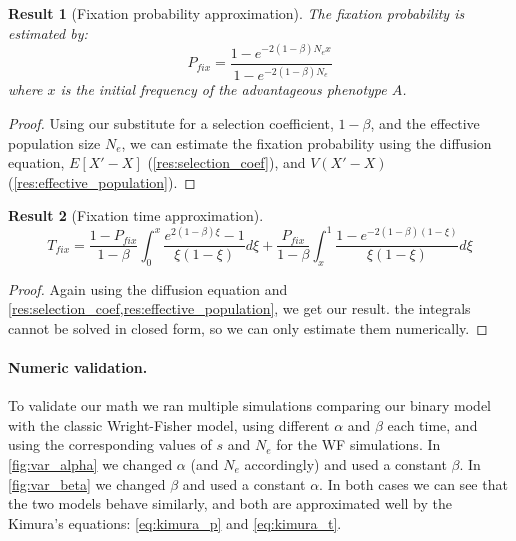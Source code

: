 \documentclass[12pt]{extarticle}
\newtheorem{result}{Result}
\begin{document}
\begin{result}[Fixation probability approximation]
The fixation probability is estimated by:
\begin{equation}\label{eq:kimura_p}
P_{fix} = \frac{1-e^{-2(1-\beta)N_e x}}{1-e^{-2(1-\beta)N_e}}
\end{equation}
where $x$ is the initial frequency of the advantageous phenotype $\hat{A}$.
\end{result}
\begin{proof}
Using our substitute for a selection coefficient, $1-\beta$, and the effective population size $N_e$, we can estimate the fixation probability using the diffusion equation, $E[X'-X]$ (\cref{res:selection_coef}), and $V(X'-X)$ (\cref{res:effective_population}).
\end{proof}

\begin{result}[Fixation time approximation]
\begin{equation}\label{eq:kimura_t}
T_{fix}=\frac{1-P_{fix}}{1-\beta}\int_0^x\frac{e^{2(1-\beta) \xi}-1}{\xi(1-\xi)}d\xi+ \frac{P_{fix}}{1-\beta}\int_x^1\frac{1-e^{-2(1-\beta)(1-\xi)}}{\xi(1-\xi)}d\xi
\end{equation}
\end{result}

\begin{proof}
Again using the diffusion equation and \cref{res:selection_coef,res:effective_population}, we get our result.
the integrals cannot be solved in closed form, so we can only estimate them numerically.
\end{proof}

\paragraph{Numeric validation.}
To validate our math we ran multiple simulations comparing our binary model with the classic Wright-Fisher model, using different $\alpha$ and $\beta$ each time, and using the corresponding values of $s$ and $N_e$ for the WF simulations.
In \cref{fig:var_alpha} we changed $\alpha$ (and $N_e$ accordingly) and used a constant $\beta$.
In \cref{fig:var_beta} we changed $\beta$ and used a constant $\alpha$.
In both cases we can see that the two models behave similarly, and both are approximated well by the Kimura's equations: \cref{eq:kimura_p} and \cref{eq:kimura_t}.
\end{document}
